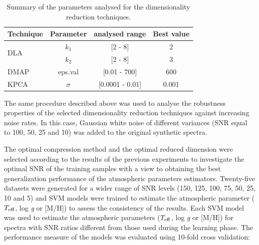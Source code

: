 \documentclass[a4paper,fleqn,usenatbib]{mnras}
\begin{document}
\begin{table}
\centering
\caption{Summary of the parameters analysed for the 
dimensionality reduction techniques.}
\label{tab:parameters}
\begin{tabular}{l c c c}
\hline
\textbf{Technique} & \textbf{Parameter} & \textbf{analysed range} & \textbf{Best value} \\
\hline
\multirow{2}{*}{DLA} 
	& $k_1$ & [2 - 8]  & 2 \\\cline{2-4}
	& $k_2$ & [2 - 8]  & 3 \\\hline
DMAP & eps.val & [0.01 - 700] & 600 \\\hline
KPCA & $\sigma$ & [0.0001 - 0.01] & 0.001 \\
\hline
\end{tabular}
\end{table}


The same procedure described above was used to analyse the 
  robustness properties of the selected dimensionality reduction
techniques against increasing noise rates. In this case,
Gaussian white noise of different variances (SNR equal to 100,
50, 25 and 10) was added to the original synthetic spectra.
 
The optimal compression method and the optimal reduced
  dimension were selected according to the results of the previous
  experiments to investigate the optimal SNR of the training samples
  with a view to obtaining the best generalization performance of the
  atmospheric parameters estimators. Twenty-five datasets were
  generated for a wider range of SNR levels (150, 125, 100, 75, 50,
  25, 10 and 5) and SVM models were trained to estimate the atmospheric 
  parameter ($T_{\rm eff}$, log \textit{g} or [M/H]) to
  assess the consistency of the results. Each SVM model was used to
  estimate the atmospheric parameters ($T_{\rm eff}$, 
  log \textit{g} or [M/H]) for spectra with SNR ratios different from
  those used during the learning phase.  The performance measure of
  the models was evaluated using 10-fold cross validation:
\end{document}
